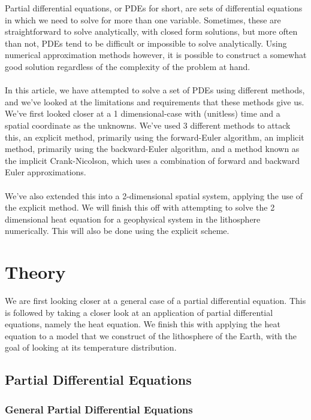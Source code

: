 \documentclass[reprint,english,notitlepage]{revtex4-1}  %
\begin{document}
Partial differential equations, or PDEs for short, are sets of differential equations in which we need to solve for more than one variable. Sometimes, these are straightforward to solve analytically, with closed form solutions, but more often than not, PDEs tend to be difficult or impossible to solve analytically. Using numerical approximation methods however, it is possible to construct a somewhat good solution regardless of the complexity of the problem at hand.
\\
\\
In this article, we have attempted to solve a set of PDEs using different methods, and we've looked at the limitations and requirements that these methods give us. We've first looked closer at a 1 dimensional-case with (unitless) time and a spatial coordinate as the unknowns. We've used 3 different methods to attack this, an explicit method, primarily using the forward-Euler algorithm, an implicit method, primarily using the backward-Euler algorithm, and a method known as the implicit Crank-Nicolson, which uses a combination of forward and backward Euler approximations.
\\
\\
We've also extended this into a 2-dimensional spatial system, applying the use of the explicit method. We will finish this off with attempting to solve the 2 dimensional heat equation for a geophysical system in the lithosphere numerically. This will also be done using the explicit scheme. 

\newpage

\section{Theory}

We are first looking closer at a general case of a partial differential equation. This is followed by taking a closer look at an application of partial differential equations, namely the heat equation. We finish this with applying the heat equation to a model that we construct of the lithosphere of the Earth, with the goal of looking at its temperature distribution.

\subsection{Partial Differential Equations}

\subsubsection{General Partial Differential Equations}
\end{document}
